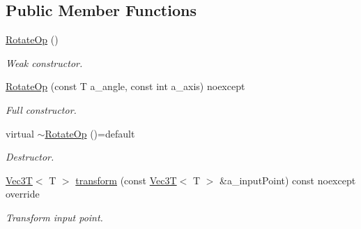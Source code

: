 \subsection*{Public Member Functions}
\begin{DoxyCompactItemize}
\item 
\mbox{\label{classRotateOp_afac8d44cae4c9109c96d2c1ae47a1dc2}} 
\hyperlink{classRotateOp_afac8d44cae4c9109c96d2c1ae47a1dc2}{Rotate\+Op} ()
\begin{DoxyCompactList}\small\item\em Weak constructor. \end{DoxyCompactList}\item 
\hyperlink{classRotateOp_a018f0a465bfaf271958ac975eb24b5bb}{Rotate\+Op} (const T a\+\_\+angle, const int a\+\_\+axis) noexcept
\begin{DoxyCompactList}\small\item\em Full constructor. \end{DoxyCompactList}\item 
\mbox{\label{classRotateOp_aaa12091fe7937f5ed7e2d35e0632337b}} 
virtual \hyperlink{classRotateOp_aaa12091fe7937f5ed7e2d35e0632337b}{$\sim$\+Rotate\+Op} ()=default
\begin{DoxyCompactList}\small\item\em Destructor. \end{DoxyCompactList}\item 
\mbox{\label{classRotateOp_aaffc25806ef6b9d7ea6651aa2bb9767c}} 
\hyperlink{classVec3T}{Vec3T}$<$ T $>$ \hyperlink{classRotateOp_aaffc25806ef6b9d7ea6651aa2bb9767c}{transform} (const \hyperlink{classVec3T}{Vec3T}$<$ T $>$ \&a\+\_\+input\+Point) const noexcept override
\begin{DoxyCompactList}\small\item\em Transform input point. \end{DoxyCompactList}\end{DoxyCompactItemize}
